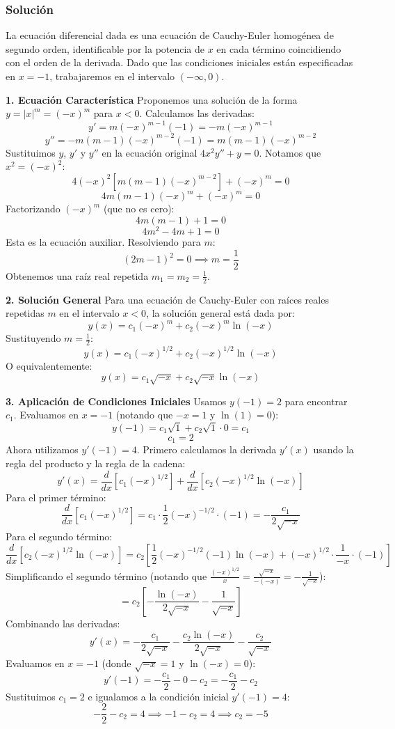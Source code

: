 \documentclass[a4paper]{article}
\begin{document}
\subsubsection{Solución}
La ecuación diferencial dada es una ecuación de Cauchy-Euler homogénea de segundo orden, identificable por la potencia de $x$ en cada término coincidiendo con el orden de la derivada. Dado que las condiciones iniciales están especificadas en $x = -1$, trabajaremos en el intervalo $(-\infty, 0)$.

\textbf{1. Ecuación Característica}
Proponemos una solución de la forma $y = |x|^m = (-x)^m$ para $x < 0$. Calculamos las derivadas:
$$
y' = m(-x)^{m-1}(-1) = -m(-x)^{m-1}
$$
$$
y'' = -m(m-1)(-x)^{m-2}(-1) = m(m-1)(-x)^{m-2}
$$
Sustituimos $y$, $y'$ y $y''$ en la ecuación original $4x^2 y'' + y = 0$. Notamos que $x^2 = (-x)^2$:
$$
4(-x)^2 [m(m-1)(-x)^{m-2}] + (-x)^m = 0
$$
$$
4m(m-1)(-x)^m + (-x)^m = 0
$$
Factorizando $(-x)^m$ (que no es cero):
$$
4m(m-1) + 1 = 0
$$
$$
4m^2 - 4m + 1 = 0
$$
Esta es la ecuación auxiliar. Resolviendo para $m$:
$$
(2m - 1)^2 = 0 \implies m = \frac{1}{2}
$$
Obtenemos una raíz real repetida $m_1 = m_2 = \frac{1}{2}$.

\textbf{2. Solución General}
Para una ecuación de Cauchy-Euler con raíces reales repetidas $m$ en el intervalo $x < 0$, la solución general está dada por:
$$
y(x) = c_1 (-x)^m + c_2 (-x)^m \ln(-x)
$$
Sustituyendo $m = \frac{1}{2}$:
$$
y(x) = c_1 (-x)^{1/2} + c_2 (-x)^{1/2} \ln(-x)
$$
O equivalentemente:
$$
y(x) = c_1 \sqrt{-x} + c_2 \sqrt{-x} \ln(-x)
$$

\textbf{3. Aplicación de Condiciones Iniciales}
Usamos $y(-1) = 2$ para encontrar $c_1$. Evaluamos en $x = -1$ (notando que $-x = 1$ y $\ln(1) = 0$):
$$
y(-1) = c_1 \sqrt{1} + c_2 \sqrt{1} \cdot 0 = c_1
$$
$$
c_1 = 2
$$
Ahora utilizamos $y'(-1) = 4$. Primero calculamos la derivada $y'(x)$ usando la regla del producto y la regla de la cadena:
$$
y'(x) = \frac{d}{dx} \left[ c_1 (-x)^{1/2} \right] + \frac{d}{dx} \left[ c_2 (-x)^{1/2} \ln(-x) \right]
$$
Para el primer término:
$$
\frac{d}{dx} [c_1 (-x)^{1/2}] = c_1 \cdot \frac{1}{2}(-x)^{-1/2} \cdot (-1) = -\frac{c_1}{2\sqrt{-x}}
$$
Para el segundo término:
$$
\frac{d}{dx} [c_2 (-x)^{1/2} \ln(-x)] = c_2 \left[ \frac{1}{2}(-x)^{-1/2}(-1)\ln(-x) + (-x)^{1/2} \cdot \frac{1}{-x} \cdot (-1) \right]
$$
Simplificando el segundo término (notando que $\frac{(-x)^{1/2}}{x} = \frac{\sqrt{-x}}{-(-x)} = -\frac{1}{\sqrt{-x}}$):
$$
= c_2 \left[ -\frac{\ln(-x)}{2\sqrt{-x}} - \frac{1}{\sqrt{-x}} \right]
$$
Combinando las derivadas:
$$
y'(x) = -\frac{c_1}{2\sqrt{-x}} - \frac{c_2 \ln(-x)}{2\sqrt{-x}} - \frac{c_2}{\sqrt{-x}}
$$
Evaluamos en $x = -1$ (donde $\sqrt{-x} = 1$ y $\ln(-x) = 0$):
$$
y'(-1) = -\frac{c_1}{2} - 0 - c_2 = -\frac{c_1}{2} - c_2
$$
Sustituimos $c_1 = 2$ e igualamos a la condición inicial $y'(-1) = 4$:
$$
-\frac{2}{2} - c_2 = 4 \implies -1 - c_2 = 4 \implies c_2 = -5
$$
\end{document}
